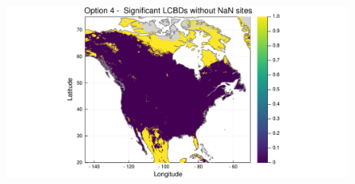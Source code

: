 \documentclass[10pt]{beamer}
\begin{document}
\begin{frame}
  \begin{figure}
    \centering
    \includegraphics[scale=0.4]{fig/lcbd-am-larger2-significant.pdf}
  \end{figure}
\end{frame}
\end{document}
